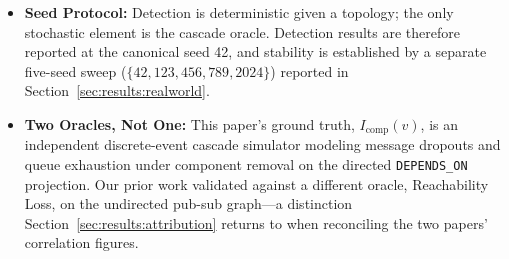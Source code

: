 \begin{itemize}
    \item \textbf{Seed Protocol:} Detection is deterministic given a topology; the only stochastic element is the cascade oracle. Detection results are therefore reported at the canonical seed 42, and stability is established by a separate five-seed sweep ($\{42, 123, 456, 789, 2024\}$) reported in Section~\ref{sec:results:realworld}.
    \item \textbf{Two Oracles, Not One:} This paper's ground truth, $I_{\text{comp}}(v)$, is an independent discrete-event cascade simulator modeling message dropouts and queue exhaustion under component removal on the directed \texttt{DEPENDS\_ON} projection. Our prior work \citep{yigit2025graph} validated against a different oracle, Reachability Loss, on the undirected pub-sub graph---a distinction Section~\ref{sec:results:attribution} returns to when reconciling the two papers' correlation figures.
\end{itemize}
